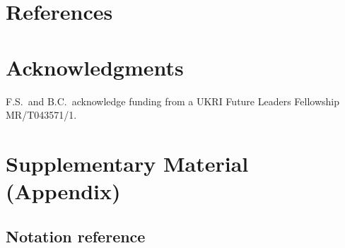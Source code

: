\documentclass[
  11pt,
  letterpaper]{siamart251216}
\begin{document}
\section{References}\label{references}

\renewcommand{\bibsection}{}


\section*{Acknowledgments}
F.S.\ and B.C.\ acknowledge funding from a UKRI Future Leaders Fellowship MR/T043571/1.

\newpage

\section{Supplementary Material
(Appendix)}\label{supplementary-material-appendix}

\subsection{Notation reference}\label{sec-notation}
\end{document}
